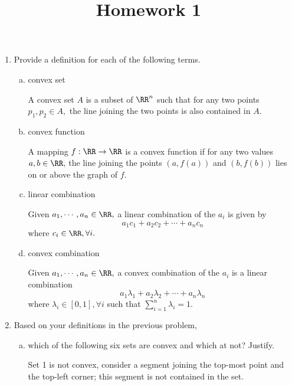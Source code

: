 \documentclass{article}
\begin{document}
\title{Homework 1}
\maketitle
\thispagestyle{fancy}

\begin{enumerate}
	\item Provide a definition for each of the following terms.

		\begin{enumerate}[(a)]
			\item convex set
				\begin{definition*}
					A convex set $A$ is a subset of $\RR^n$ such that for any two points $p_1, p_2\in A,$ the line joining the two points is also contained in $A.$
				\end{definition*}

			\item convex function
				\begin{definition*}
					A mapping $f:\RR\to\RR$ is a convex function if for any two values $a, b\in\RR,$ the line joining the points $(a, f(a))$ and $(b, f(b))$ lies on or above the graph of $f.$
				\end{definition*}

			\item linear combination
				\begin{definition*}
					Given $a_1, \cdots, a_n\in\RR,$ a linear combination of the $a_i$ is given by
					\[a_1c_1+a_2c_2+\cdots+a_nc_n\]
					where $c_i\in\RR, \forall i.$
				\end{definition*}

			\item convex combination
				\begin{definition*}
					Given $a_1, \cdots, a_n\in \RR,$ a convex combination of the $a_i$ is a linear combination
					\[a_1\lambda_1 + a_2\lambda_2+\cdots+a_n\lambda_n\]
					where $\lambda_i\in\left[ 0, 1 \right], \forall i$ such that $\displaystyle\sum_{i=1}^{n}\lambda_i=1.$
				\end{definition*}

		\end{enumerate}

	\item Based on your definitions in the previous problem,

		\begin{enumerate}[(a)]
			\item which of the following six sets are convex and which at not? Justify.
				\begin{soln}
					Set 1 is not convex, consider a segment joining the top-most point and the top-left corner; this segment is not contained in the set.


\end{soln}
\end{enumerate}
\end{enumerate}
\end{document}
